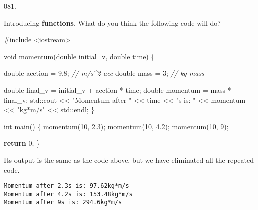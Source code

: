\documentclass[]{book}
\newenvironment{Shaded}{}{}
\newcommand{\BuiltInTok}[1]{#1}
\newcommand{\CommentTok}[1]{\textcolor[rgb]{0.38,0.63,0.69}{\textit{#1}}}
\newcommand{\ControlFlowTok}[1]{\textcolor[rgb]{0.00,0.44,0.13}{\textbf{#1}}}
\newcommand{\DataTypeTok}[1]{\textcolor[rgb]{0.56,0.13,0.00}{#1}}
\newcommand{\DecValTok}[1]{\textcolor[rgb]{0.25,0.63,0.44}{#1}}
\newcommand{\FloatTok}[1]{\textcolor[rgb]{0.25,0.63,0.44}{#1}}
\newcommand{\ImportTok}[1]{#1}
\newcommand{\NormalTok}[1]{#1}
\newcommand{\PreprocessorTok}[1]{\textcolor[rgb]{0.74,0.48,0.00}{#1}}
\newcommand{\StringTok}[1]{\textcolor[rgb]{0.25,0.44,0.63}{#1}}
\begin{document}
\begin{minipage}{\linewidth}\noindent
{\tiny 081.}\\
\begin{minipage}[t]{.485\linewidth}

Introducing \textbf{functions}. What do you think the following code
will do?

\begin{framed}

\begin{Shaded}
\begin{Highlighting}[]
\PreprocessorTok{#include }\ImportTok{<iostream>}

\DataTypeTok{void}\NormalTok{ momentum(}\DataTypeTok{double}\NormalTok{ initial_v, }\DataTypeTok{double}\NormalTok{ time) \{}

  \DataTypeTok{double}\NormalTok{ acction   = }\FloatTok{9.8}\NormalTok{; }\CommentTok{// m/s^2 acc}
  \DataTypeTok{double}\NormalTok{ mass      = }\DecValTok{3}\NormalTok{;   }\CommentTok{// kg    mass}

  \DataTypeTok{double}\NormalTok{ final_v = initial_v + acction * time;}
  \DataTypeTok{double}\NormalTok{ momentum = mass * final_v;}
  \BuiltInTok{std::}\NormalTok{cout << }\StringTok{"Momentum after "}\NormalTok{ << time}
\NormalTok{            << }\StringTok{"s is: "}\NormalTok{ << momentum << }\StringTok{"kg*m/s"}
\NormalTok{            << }\BuiltInTok{std::}\NormalTok{endl;}
\NormalTok{\}}

\DataTypeTok{int}\NormalTok{ main() \{}
\NormalTok{  momentum(}\DecValTok{10}\NormalTok{, }\FloatTok{2.3}\NormalTok{);}
\NormalTok{  momentum(}\DecValTok{10}\NormalTok{, }\FloatTok{4.2}\NormalTok{);}
\NormalTok{  momentum(}\DecValTok{10}\NormalTok{, }\DecValTok{9}\NormalTok{);}

  \ControlFlowTok{return} \DecValTok{0}\NormalTok{;}
\NormalTok{\}}
\end{Highlighting}
\end{Shaded}

\end{framed}

\end{minipage}
\hfill
\begin{minipage}[t]{.485\linewidth}

Its output is the same as the code above, but we have eliminated all the
repeated code.

\begin{framed}

\begin{verbatim}
Momentum after 2.3s is: 97.62kg*m/s
Momentum after 4.2s is: 153.48kg*m/s
Momentum after 9s is: 294.6kg*m/s
\end{verbatim}


\end{framed}
\end{minipage}
\end{minipage}
\end{document}
